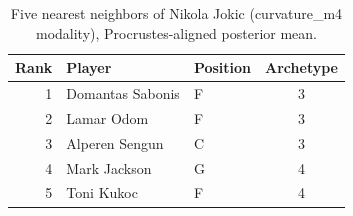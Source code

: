 \begin{table}[htbp]
  \centering\small
  \begin{tabular}{rllc}
    \toprule
    Rank & Player & Position & Archetype \\
    \midrule
    1 & Domantas Sabonis & F & 3 \\
    2 & Lamar Odom & F & 3 \\
    3 & Alperen Sengun & C & 3 \\
    4 & Mark Jackson & G & 4 \\
    5 & Toni Kukoc & F & 4 \\
    \bottomrule
  \end{tabular}
  \caption{Five nearest neighbors of Nikola Jokic (curvature_m4 modality), Procrustes-aligned posterior mean.}
  \label{tab:Nikola_Jokic_neighbors_curvature_m4}
\end{table}

